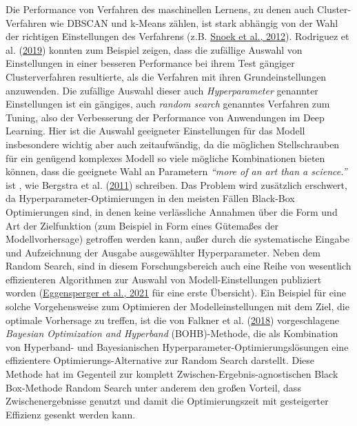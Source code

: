 \documentclass[
  12pt,
]{book}
\begin{document}
Die Performance von Verfahren des maschinellen Lernens, zu denen auch Cluster-Verfahren wie DBSCAN und k-Means zählen, ist stark abhängig von der Wahl der richtigen Einstellungen des Verfahrens (z.B. \protect\hyperlink{ref-snoekPracticalBayesianOptimization2012}{Snoek et al., 2012}). Rodriguez et al. (\protect\hyperlink{ref-rodriguezClusteringAlgorithmsComparative2019a}{2019}) konnten zum Beispiel zeigen, dass die zufällige Auswahl von Einstellungen in einer besseren Performance bei ihrem Test gängiger Clusterverfahren resultierte, als die Verfahren mit ihren Grundeinstellungen anzuwenden.
Die zufällige Auswahl dieser auch \emph{Hyperparameter} genannter Einstellungen ist ein gängiges, auch \emph{random search} genanntes Verfahren zum Tuning, also der Verbesserung der Performance von Anwendungen im Deep Learning. Hier ist die Auswahl geeigneter Einstellungen für das Modell insbesondere wichtig aber auch zeitaufwändig, da die möglichen Stellschrauben für ein genügend komplexes Modell so viele mögliche Kombinationen bieten können, dass die geeignete Wahl an Parametern \emph{``more of an art than a science.''} ist , wie Bergstra et al. (\protect\hyperlink{ref-bergstraAlgorithmsHyperParameterOptimization2011}{2011}) schreiben. Das Problem wird zusätzlich erschwert, da Hyperparameter-Optimierungen in den meisten Fällen Black-Box Optimierungen sind, in denen keine verlässliche Annahmen über die Form und Art der Zielfunktion (zum Beispiel in Form eines Gütemaßes der Modellvorhersage) getroffen werden kann, außer durch die systematische Eingabe und Aufzeichnung der Ausgabe ausgewählter Hyperparameter. Neben dem Random Search, sind in diesem Forschungsbereich auch eine Reihe von wesentlich effizienteren Algorithmen zur Auswahl von Modell-Einstellungen publiziert worden (\protect\hyperlink{ref-eggenspergerHPOBenchCollectionReproducible2021}{Eggensperger et al., 2021} für eine erste Übersicht).
Ein Beispiel für eine solche Vorgehensweise zum Optimieren der Modelleinstellungen mit dem Ziel, die optimale Vorhersage zu treffen, ist die von Falkner et al. (\protect\hyperlink{ref-falknerBOHBRobustEfficient2018}{2018}) vorgeschlagene \emph{Bayesian Optimization and Hyperband} (BOHB)-Methode, die als Kombination von Hyperband- und Bayesianischen Hyperparameter-Optimierungslösungen eine effizientere Optimierungs-Alternative zur Random Search darstellt. Diese Methode hat im Gegenteil zur komplett Zwischen-Ergebnis-agnostischen Black Box-Methode Random Search unter anderem den großen Vorteil, dass Zwischenergebnisse genutzt und damit die Optimierungszeit mit gesteigerter Effizienz gesenkt werden kann.
\end{document}
